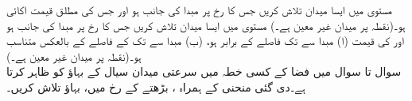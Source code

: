 مستوی  میں ایسا میدان  تلاش کریں جس کا رخ    پر مبدا کی جانب ہو اور جس کی مطلق قیمت اکائی ہو۔(نقطہ  پر میدان غیر معین ہے۔)
مستوی  میں ایسا میدان  تلاش کریں جس کا رخ  پر مبدا کی جانب ہو اور    کی قیمت  (ا) مبدا سے   تک فاصلے  کے برابر ہو، (ب) مبدا سے   تک  کے فاصلے کے بالعکس متناسب ہو۔(نقطہ  پر میدان غیر معین ہے۔)
\\
سوال  تا سوال  میں فضا کے کسی خطہ میں سرعتی میدان  سیال کے بہاؤ کو ظاہر کرتا ہے۔دی گئی منحنی کے ہمراہ ، بڑھتے  کے رخ میں، بہاؤ   تلاش کریں۔

